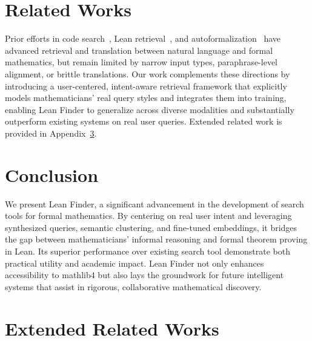 \documentclass{article} %
\begin{document}
\section{Related Works}

Prior efforts in code search~\citep{husain2019codesearchnet,wang2023codet5+}, Lean retrieval~\citep{gao2024semantic,gao2024herald,leanexplore, loogle, moogle}, and autoformalization~\citep{mma,leanstar,wang2024theoremllama,leanworkbook} have advanced retrieval and translation between natural language and formal mathematics, but remain limited by narrow input types, paraphrase-level alignment, or brittle translations. Our work complements these directions by introducing a user-centered, intent-aware retrieval framework that explicitly models mathematicians’ real query styles and integrates them into training, enabling Lean Finder to generalize across diverse modalities and substantially outperform existing systems on real user queries. Extended related work is provided in Appendix~\ref{extended_related_work}.

\section{Conclusion}

We present Lean Finder, a significant advancement in the development of search tools for formal mathematics. By centering on real user intent and leveraging synthesized queries, semantic clustering, and fine-tuned embeddings, it bridges the gap between mathematicians’ informal reasoning and formal theorem proving in Lean. Its superior performance over existing search tool demonstrate both practical utility and academic impact. Lean Finder not only enhances accessibility to mathlib4 but also lays the groundwork for future intelligent systems that assist in rigorous, collaborative mathematical discovery.






\newpage
\appendix
\section{Extended Related Works}
\label{extended_related_work}
\end{document}
